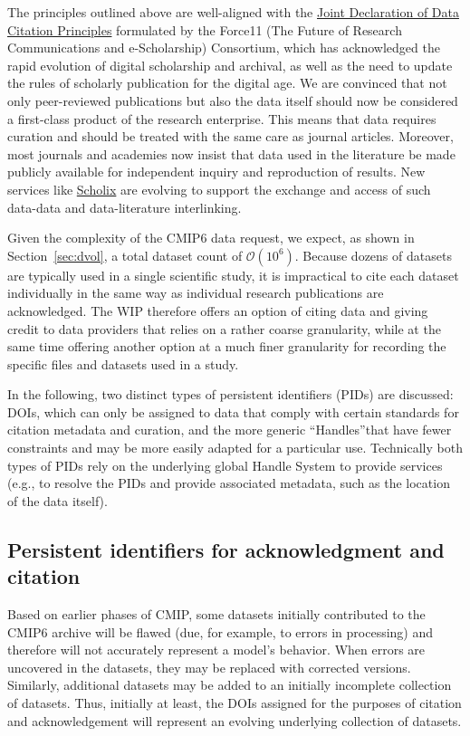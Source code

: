 \documentclass[gmd,manuscript]{copernicus}
\newcommand{\secref}[1] {\mbox{Section  \ref{sec:#1}}}
\begin{document}
The principles outlined above are well-aligned with the
\href{https://goo.gl/Pzb7F6}{Joint Declaration of Data Citation
Principles} formulated by the Force11 (The Future of Research
Communications and e-Scholarship) Consortium, which has acknowledged
the rapid evolution of digital scholarship and archival, as well as
the need to update the rules of scholarly publication for the digital
age. We are convinced that not only peer-reviewed publications but
also the data itself should now be considered a first-class product of
the research enterprise. This means that data requires curation and
should be treated with the same care as journal articles. Moreover,
most journals and academies now insist that data used in the
literature be made publicly available for independent inquiry and
reproduction of results. New services like
\href{http://www.scholix.org}{Scholix} are evolving to support the
exchange and access of such data-data and data-literature
interlinking.

Given the complexity of the CMIP6 data request, we expect, as shown in
\secref{dvol}, a total dataset count of $\mathcal{O}(10^6)$. Because
dozens of datasets are typically used in a single scientific study, it
is impractical to cite each dataset individually in the same way as
individual research publications are acknowledged. The WIP therefore
offers an option of citing data and giving credit to data providers
that relies on a rather coarse granularity, while at the same time
offering another option at a much finer granularity for recording the
specific files and datasets used in a study.

In the following, two distinct types of persistent identifiers (PIDs)
are discussed: DOIs, which can only be assigned to data that comply
with certain standards for citation metadata and curation, and the
more generic ``Handles''that have fewer constraints and may be more
easily adapted for a particular use. Technically both types of PIDs
rely on the underlying global Handle System to provide services (e.g.,
to resolve the PIDs and provide associated metadata, such as the
location of the data itself).

\subsection{Persistent identifiers for acknowledgment and citation}
\label{sec:doi}


Based on earlier phases of CMIP, some datasets initially contributed
to the CMIP6 archive will be flawed (due, for example, to errors in
processing) and therefore will not accurately represent a model's
behavior. When errors are uncovered in the datasets, they may be
replaced with corrected versions. Similarly, additional datasets may
be added to an initially incomplete collection of datasets. Thus,
initially at least, the DOIs assigned for the purposes of citation and
acknowledgement will represent an evolving underlying collection of
datasets.
\end{document}
